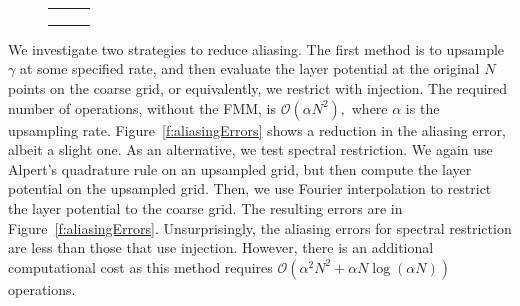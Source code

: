 \begin{figure}[htpb]
  \centering
  \begin{tabular}{ccc}
   &
   &
   \\
   &
   &
   \\
   &
   &
  
  \end{tabular}
\end{figure}

We investigate two strategies to reduce aliasing.  The first method is
to upsample $\gamma$ at some specified rate, and then evaluate the layer
potential at the original $N$ points on the coarse grid, or
equivalently, we restrict with injection.  The required number of
operations, without the FMM, is $\mathcal{O}(\alpha N^{2}),$ where
$\alpha$ is the upsampling rate.  Figure~\ref{f:aliasingErrors} shows a
reduction in the aliasing error, albeit a slight one.  As an
alternative, we test spectral restriction.  We again use Alpert's
quadrature rule on an upsampled grid, but then compute the layer
potential on the upsampled grid.  Then, we use Fourier interpolation to
restrict the layer potential to the coarse grid.  The resulting errors
are in Figure~\ref{f:aliasingErrors}.  Unsurprisingly, the aliasing
errors for spectral restriction are less than those that use injection.
However, there is an additional computational cost as this method
requires $\mathcal{O}(\alpha^{2}N^{2} + \alpha N \log(\alpha N))$
operations.

